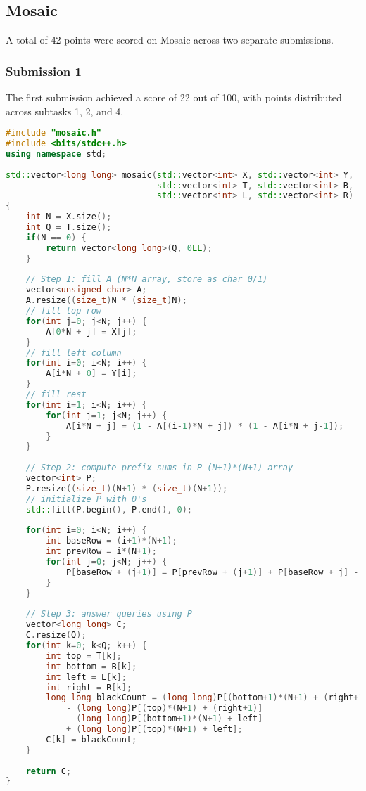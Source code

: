 \subsection{Mosaic}
A total of 42 points were scored on Mosaic across two separate submissions.

\subsubsection{Submission 1}
The first submission achieved a score of 22 out of 100, with points distributed across subtasks 1, 2, and 4.

\begin{lstlisting}[language=C++]
#include "mosaic.h"
#include <bits/stdc++.h>
using namespace std;
 
std::vector<long long> mosaic(std::vector<int> X, std::vector<int> Y,
                              std::vector<int> T, std::vector<int> B,
                              std::vector<int> L, std::vector<int> R)
{
    int N = X.size();
    int Q = T.size();
    if(N == 0) {
        return vector<long long>(Q, 0LL);
    }
 
    // Step 1: fill A (N*N array, store as char 0/1)
    vector<unsigned char> A;
    A.resize((size_t)N * (size_t)N);
    // fill top row
    for(int j=0; j<N; j++) {
        A[0*N + j] = X[j];
    }
    // fill left column
    for(int i=0; i<N; i++) {
        A[i*N + 0] = Y[i];
    }
    // fill rest
    for(int i=1; i<N; i++) {
        for(int j=1; j<N; j++) {
            A[i*N + j] = (1 - A[(i-1)*N + j]) * (1 - A[i*N + j-1]);
        }
    }
 
    // Step 2: compute prefix sums in P (N+1)*(N+1) array
    vector<int> P;
    P.resize((size_t)(N+1) * (size_t)(N+1));
    // initialize P with 0's
    std::fill(P.begin(), P.end(), 0);
 
    for(int i=0; i<N; i++) {
        int baseRow = (i+1)*(N+1);
        int prevRow = i*(N+1);
        for(int j=0; j<N; j++) {
            P[baseRow + (j+1)] = P[prevRow + (j+1)] + P[baseRow + j] - P[prevRow + j] + (A[i*N + j]);
        }
    }
 
    // Step 3: answer queries using P
    vector<long long> C;
    C.resize(Q);
    for(int k=0; k<Q; k++) {
        int top = T[k];
        int bottom = B[k];
        int left = L[k];
        int right = R[k];
        long long blackCount = (long long)P[(bottom+1)*(N+1) + (right+1)]
            - (long long)P[(top)*(N+1) + (right+1)]
            - (long long)P[(bottom+1)*(N+1) + left]
            + (long long)P[(top)*(N+1) + left];
        C[k] = blackCount;
    }
 
    return C;
}
\end{lstlisting}

